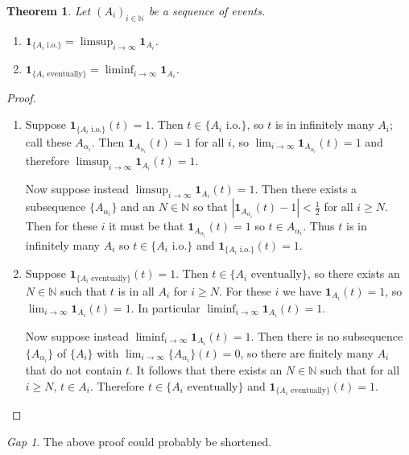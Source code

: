 \documentclass[11pt]{article}
\newcommand{\charf}[1]{\mathbf{1}_{#1}}
\newcommand{\NN}{\mathbb{N}}
\theoremstyle{theorem}
\newtheorem{theorem}{Theorem}[section]
\theoremstyle{definition}
\theoremstyle{remark}
\theoremstyle{step}
\theoremstyle{gap}
\newtheorem*{gap}{Gap}
\begin{document}
\begin{theorem}
Let \((A_i)_{i \in \NN}\) be a sequence of events.
\begin{enumerate}
\item
\(\charf{\{A_i \text{ i.o.}\}} = \limsup_{i \to \infty} \charf{A_i}\).
\item
\(\charf{\{A_i \text{ eventually}\}} = \liminf_{i \to \infty} \charf{A_i}\).
\end{enumerate}
\end{theorem}

\begin{proof}\ 
\begin{enumerate}
\item
Suppose \(\charf{\{A_i \text{ i.o.}\}}(t) = 1\). Then \(t \in \{A_i \text{ i.o.}\}\), so \(t\) is in infinitely many \(A_i\); call these \(A_{\alpha_i}\). Then \(\charf{A_{\alpha_i}}(t) = 1\) for all \(i\), so \(\lim_{i \to \infty} \charf{A_{\alpha_i}}(t) = 1\) and therefore \(\limsup_{i \to \infty} \charf{A_{i}}(t) = 1\).

Now suppose instead \(\limsup_{i \to \infty} \charf{A_{i}}(t) = 1\). Then there exists a subsequence \(\{A_{\alpha_i}\}\) and an \(N \in \NN\) so that \(\left|\charf{A_{\alpha_i}}(t) - 1 \right| < \frac{1}{2}\) for all \(i \geq N\). Then for these \(i\) it must be that  \(\charf{A_{\alpha_i}}(t) = 1\) so \(t \in A_{\alpha_i}\). Thus \(t\) is in infinitely many \(A_i\) so \(t \in \{A_i \text{ i.o.}\}\) and \(\charf{\{A_i \text{ i.o.}\}}(t) = 1\).

\item
Suppose \(\charf{\{A_i \text{ eventually}\}}(t) = 1\). Then \(t \in \{A_i \text{ eventually}\}\), so there exists an \(N \in \NN\) such that \(t\) is in all \(A_i\) for \(i \geq N\). For these \(i\) we have \(\charf{A_i}(t)=1\), so \(\lim_{i \to \infty} \charf{A_i}(t) = 1\). In particular \(\liminf_{i \to \infty} \charf{A_i}(t) = 1\).

Now suppose instead \(\liminf_{i \to \infty} \charf{A_i}(t) = 1\). Then there is no subsequence \(\{A_{\alpha_i}\}\) of \(\{A_i\}\) with \(\lim_{i \to \infty}\{A_{\alpha_i}\}(t) =0\), so there are finitely many \(A_i\) that do not contain \(t\). It follows that there exists an \(N \in \NN\) such that for all \(i \geq N\), \(t \in A_i\). Therefore \(t \in \{A_i \text{ eventually}\}\) and \(\charf{\{A_i \text{ eventually}\}}(t) = 1\).
\end{enumerate}
\end{proof}

\begin{gap}
The above proof could probably be shortened.
\end{gap}
\end{document}
